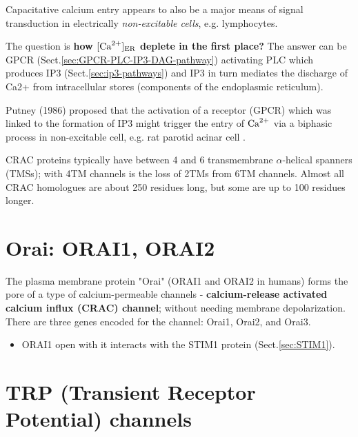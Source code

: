 Capacitative calcium entry appears to also be a major means of signal
transduction in electrically {\it non-excitable cells}, e.g. lymphocytes.


\begin{mdframed}

The question is {\bf how $[{\text{Ca}^{2+}}]_{\text{ER}}$ deplete in the first place?} The answer can
be GPCR (Sect.\ref{sec:GPCR-PLC-IP3-DAG-pathway}) activating PLC which produces
IP3 (Sect.\ref{sec:ip3-pathways}) and IP3 in turn mediates the discharge of Ca2+
from intracellular stores (components of the endoplasmic reticulum).

Putney (1986) proposed that the activation of a receptor (GPCR) which was linked
to the formation of IP3 might trigger the entry of ${\text{Ca}^{2+}}$ via a biphasic process
in non-excitable cell, e.g. rat parotid acinar cell \citep{putney1986,
takemura1989}.

\end{mdframed}

CRAC proteins typically have between 4 and 6 transmembrane $\alpha$-helical
spanners (TMSs); with 4TM channels is the loss of 2TMs from 6TM channels.
Almost all CRAC homologues are about 250 residues long, but some are up to 100
residues longer.


\section{Orai: ORAI1, ORAI2}
\label{sec:Orai}
\label{sec:ORAI1}

The plasma membrane protein "Orai" (ORAI1 and ORAI2 in humans) forms the pore of
a type of calcium-permeable channels - {\bf calcium-release activated calcium
influx (CRAC) channel}; without needing membrane depolarization. There are three
genes encoded for the channel: Orai1, Orai2, and Orai3.

\begin{itemize}
  \item  ORAI1 open with it interacts with the STIM1 protein
  (Sect.\ref{sec:STIM1}).
\end{itemize} 



\section{TRP (Transient Receptor Potential) channels}
\label{chap:TRP}
\label{chap:TRP-family}

